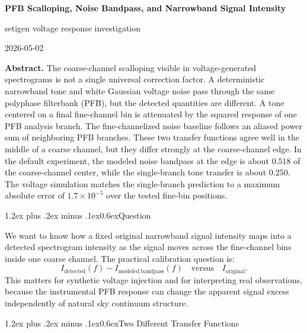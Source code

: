 \documentclass[10pt]{article}
\makeatletter
\renewcommand\section{\@startsection{section}{1}{0pt}%
  {1.2ex plus .2ex minus .1ex}{0.6ex}{\normalsize\bfseries}}
\makeatother
\begin{document}
\begin{center}
{\normalsize\bfseries PFB Scalloping, Noise Bandpass, and Narrowband Signal Intensity\par}
\vspace{0.4em}
{\normalsize setigen voltage response investigation\par}
{\normalsize 2026-05-02\par}
\end{center}

\noindent\textbf{Abstract.}
The coarse-channel scalloping visible in voltage-generated spectrograms is not a
single universal correction factor.  A deterministic narrowband tone and white
Gaussian voltage noise pass through the same polyphase filterbank (PFB), but the
detected quantities are different.  A tone centered on a final fine-channel bin
is attenuated by the squared response of one PFB analysis branch.  The
fine-channelized noise baseline follows an aliased power sum of neighboring PFB
branches.  These two transfer functions agree well in the middle of a coarse
channel, but they differ strongly at the coarse-channel edge.  In the default
experiment, the modeled noise bandpass at the edge is about $0.518$ of the
coarse-channel center, while the single-branch tone transfer is about $0.250$.
The voltage simulation matches the single-branch prediction to a maximum
absolute error of $1.7\times 10^{-5}$ over the tested fine-bin positions.
\par\vspace{1em}

\section{Question}

We want to know how a fixed original narrowband signal intensity maps into a
detected spectrogram intensity as the signal moves across the fine-channel bins
inside one coarse channel.  The practical calibration question is:
\[
    I_{\mathrm{detected}}(f) - I_{\mathrm{modeled\ bandpass}}(f)
    \quad \mathrm{versus} \quad
    I_{\mathrm{original}} .
\]
This matters for synthetic voltage injection and for interpreting real
observations, because the instrumental PFB response can change the apparent
signal excess independently of natural sky continuum structure.

\section{Two Different Transfer Functions}
\end{document}
